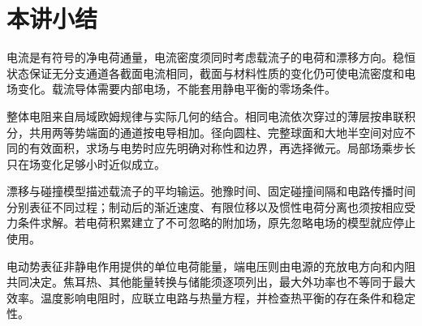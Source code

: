\section{本讲小结}

电流是有符号的净电荷通量，电流密度须同时考虑载流子的电荷和漂移方向。稳恒状态保证无分支通道各截面电流相同，截面与材料性质的变化仍可使电流密度和电场变化。载流导体需要内部电场，不能套用静电平衡的零场条件。

整体电阻来自局域欧姆规律与实际几何的结合。相同电流依次穿过的薄层按串联积分，共用两等势端面的通道按电导相加。径向圆柱、完整球面和大地半空间对应不同的有效面积，求场与电势时应先明确对称性和边界，再选择微元。局部场乘步长只在场变化足够小时近似成立。

漂移与碰撞模型描述载流子的平均输运。弛豫时间、固定碰撞间隔和电路传播时间分别表征不同过程；制动后的渐近速度、有限位移以及惯性电荷分离也须按相应受力条件求解。若电荷积累建立了不可忽略的附加场，原先忽略电场的模型就应停止使用。

电动势表征非静电作用提供的单位电荷能量，端电压则由电源的充放电方向和内阻共同决定。焦耳热、其他能量转换与储能须逐项列出，最大外功率也不等同于最大效率。温度影响电阻时，应联立电路与热量方程，并检查热平衡的存在条件和稳定性。
